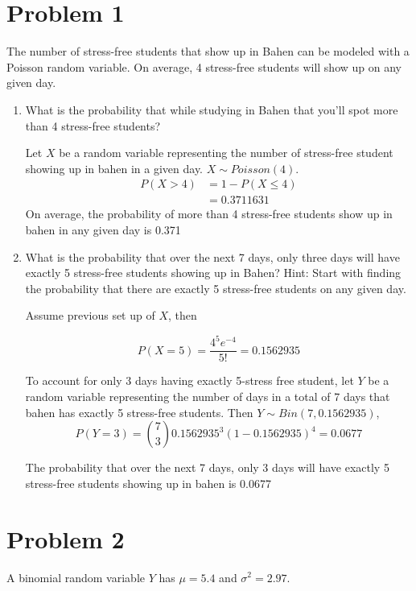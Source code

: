 \documentclass[11pt]{article}
\begin{document}
\section*{Problem 1}
The number of stress-free students that show up in Bahen can be modeled with a Poisson random variable. On average, 4 stress-free students will show up on any given day.
\begin{enumerate}
  \item  What is the probability that while studying in Bahen that you’ll spot more than 4 stress-free students?

  \begin{solution}
    $ $\\
    Let $X$ be a random variable representing the number of stress-free student showing up in bahen in a given day. $X \sim Poisson(4)$.
    \begin{align*}
      P(X > 4) &= 1 - P(X\leq 4)\\
      &=0.3711631 \tag{using R to compute $ppois(4, 4)$}
    \end{align*}
    On average, the probability of more than 4 stress-free students show up in bahen in any given day is 0.371
  \end{solution}

  \item What is the probability that over the next 7 days, only three days will have exactly 5 stress-free students showing up in Bahen? Hint: Start with finding the probability that there are exactly 5 stress-free students on any given day.

  \begin{solution}
    $ $\\
    Assume previous set up of $X$, then

    \[
      P(X = 5)= \frac{4^5e^{-4}}{5!} = 0.1562935
    \]

    To account for only 3 days having exactly 5-stress free student, let $Y$ be a random variable representing the number of days in a total of 7 days that bahen has exactly 5 stress-free students. Then $Y\sim Bin(7, 0.1562935)$,
    \[
      P(Y = 3) = \binom{7}{3}0.1562935^3(1-0.1562935)^4 = 0.0677
    \]
  \end{solution}
  The probability that over the next 7 days, only 3 days will have exactly 5 stress-free students showing up in bahen is 0.0677
\end{enumerate}

\pagebreak

\section*{Problem 2}
A binomial random variable $Y$ has $\mu = 5.4$ and $\sigma^2 = 2.97$.
\end{document}
